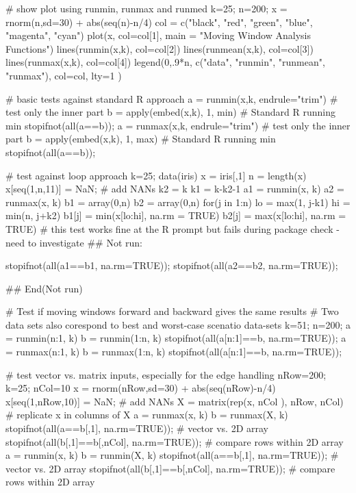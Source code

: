 \begin{Examples}
\begin{ExampleCode}
  # show plot using runmin, runmax and runmed
  k=25; n=200;
  x = rnorm(n,sd=30) + abs(seq(n)-n/4)
  col = c("black", "red", "green", "blue", "magenta", "cyan")
  plot(x, col=col[1], main = "Moving Window Analysis Functions")
  lines(runmin(x,k), col=col[2])
  lines(runmean(x,k), col=col[3])
  lines(runmax(x,k), col=col[4])
  legend(0,.9*n, c("data", "runmin", "runmean", "runmax"), col=col, lty=1 )

  # basic tests against standard R approach
  a = runmin(x,k, endrule="trim") # test only the inner part 
  b = apply(embed(x,k), 1, min)   # Standard R running min
  stopifnot(all(a==b));
  a = runmax(x,k, endrule="trim") # test only the inner part
  b = apply(embed(x,k), 1, max)   # Standard R running min
  stopifnot(all(a==b));
  
  # test against loop approach
  k=25; 
  data(iris)
  x = iris[,1]
  n = length(x)
  x[seq(1,n,11)] = NaN;                # add NANs
  k2 = k
  k1 = k-k2-1
  a1 = runmin(x, k)
  a2 = runmax(x, k)
  b1 = array(0,n)
  b2 = array(0,n)
  for(j in 1:n) {
    lo = max(1, j-k1)
    hi = min(n, j+k2)
    b1[j] = min(x[lo:hi], na.rm = TRUE)
    b2[j] = max(x[lo:hi], na.rm = TRUE)
  }
  # this test works fine at the R prompt but fails during package check - need to investigate
  ## Not run: 
 
  stopifnot(all(a1==b1, na.rm=TRUE));
  stopifnot(all(a2==b2, na.rm=TRUE));
  
## End(Not run)
  
  # Test if moving windows forward and backward gives the same results
  # Two data sets also corespond to best and worst-case scenatio data-sets
  k=51; n=200;
  a = runmin(n:1, k) 
  b = runmin(1:n, k)
  stopifnot(all(a[n:1]==b, na.rm=TRUE));
  a = runmax(n:1, k)
  b = runmax(1:n, k)
  stopifnot(all(a[n:1]==b, na.rm=TRUE));

  # test vector vs. matrix inputs, especially for the edge handling
  nRow=200; k=25; nCol=10
  x = rnorm(nRow,sd=30) + abs(seq(nRow)-n/4)
  x[seq(1,nRow,10)] = NaN;              # add NANs
  X = matrix(rep(x, nCol ), nRow, nCol) # replicate x in columns of X
  a = runmax(x, k)
  b = runmax(X, k)
  stopifnot(all(a==b[,1], na.rm=TRUE));        # vector vs. 2D array
  stopifnot(all(b[,1]==b[,nCol], na.rm=TRUE)); # compare rows within 2D array
  a = runmin(x, k)
  b = runmin(X, k)
  stopifnot(all(a==b[,1], na.rm=TRUE));        # vector vs. 2D array
  stopifnot(all(b[,1]==b[,nCol], na.rm=TRUE)); # compare rows within 2D array


\end{ExampleCode}
\end{Examples}
